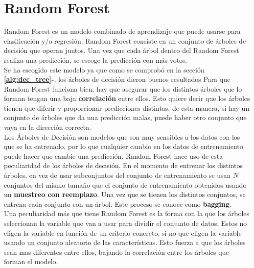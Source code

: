 \section{Random Forest}
\label{sec:rf}
Random Forest es un modelo combinado de aprendizaje que puede usarse para clasificación y/o regresión. Random Forest consiste en un conjunto de árboles de decisión que operan juntos. Una vez que cada árbol dentro del Random Forest realiza una predicción, se escoge la predicción con más votos. \\ Se ha escogido este modelo ya que como se comprobó en la sección \textbf{\ref{alg:dec_tree}-}, los árboles de decisión dieron buenos resultados
\linebreak
Para que Random Forest funciona bien, hay que asegurar que los distintos árboles que lo forman tengan una baja \textbf{correlación} entre ellos. Esto quiere decir que los árboles tienen que diferir y proporcionar predicciones distintas, de esta manera, si hay un conjunto de árboles que da una predicción malas, puede haber otro conjunto que vaya en la dirección correcta. \\
\linebreak
Los Árboles de Decisión son modelos que son muy sensibles a los datos con los que se ha entrenado, por lo que cualquier cambio en los datos de entrenamiento puede hacer que cambie una predicción. Random Forest hace uso de esta peculiaridad de los árboles de decisión.
En el momento de entrenar los distintos árboles, en vez de usar subconjuntos del conjunto de entrenamiento se usan $N$ conjuntos del mismo tamaño que el conjunto de entrenamiento obtenidos usando un \textbf{muestreo con reemplazo}. Una vez que se tienen los distintos conjuntos, se entrena cada conjunto con un árbol. Este proceso se conoce como \textbf{bagging}.\\
\linebreak
Una peculiaridad más que tiene Random Forest es la forma con la que los árboles seleccionan la variable que van a usar para dividir el conjunto de datos. Estos no eligen la variable en función de un criterio concreto, si no que eligen la variable usando un conjunto aleatorio de las características. Esto fuerza a que los árboles sean mas diferentes entre ellos, bajando la correlación entre los árboles que forman el modelo.
